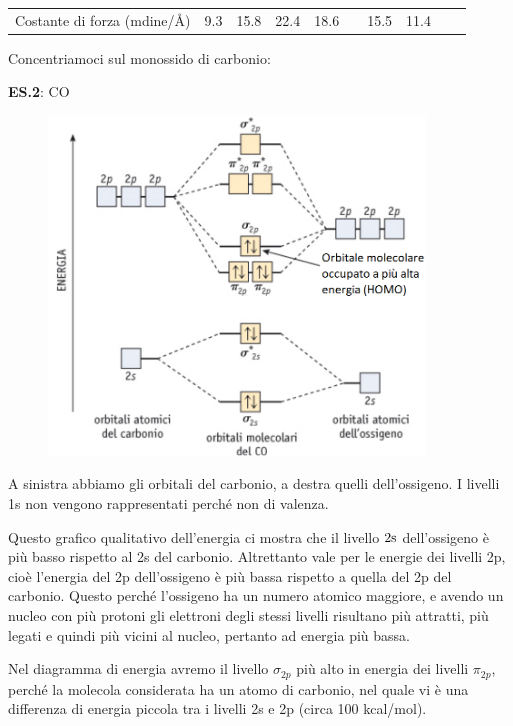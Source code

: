 \begin{center}
\begin{tabular}{m{3.4cm}m{1cm}m{1cm}m{1cm}m{1cm}|m{1cm}m{1cm}m{1cm}m{1cm}m{1cm}}
        \vspace{0.2cm}Costante di forza (mdine/Å) & \vspace{0.2cm}9.3 & \vspace{0.2cm}15.8 & \vspace{0.2cm}22.4 & \vspace{0.2cm}18.6 & & \vspace{0.2cm}15.5 & \vspace{0.2cm}11.4
    \end{tabular}
\end{center}

Concentriamoci sul monossido di carbonio:

\vspace{0.2cm}\textbf{ES.2}: CO

\begin{figure}[htp]
    \centering
    \includegraphics[width=10cm]{immagini/orbitali_molecolari_CO.png}
\end{figure}

A sinistra abbiamo gli orbitali del carbonio, a destra quelli dell'ossigeno. I livelli 1s non vengono rappresentati perché non di valenza.

Questo grafico qualitativo dell'energia ci mostra che il livello $\rm 2s$ dell'ossigeno è più basso rispetto al 2s del carbonio. Altrettanto vale per le energie dei livelli 2p, cioè l'energia del 2p dell'ossigeno è più bassa rispetto a quella del 2p del carbonio. Questo perché l'ossigeno ha un numero atomico maggiore, e avendo un nucleo con più protoni gli elettroni degli stessi livelli risultano più attratti, più legati e quindi più vicini al nucleo, pertanto ad energia più bassa.

Nel diagramma di energia avremo il livello $\sigma_{2p}$ più alto in energia dei livelli $\pi_{2p}$, perché la molecola considerata ha un atomo di carbonio, nel quale vi è una differenza di energia piccola tra i livelli 2s e 2p (circa 100 kcal/mol).

